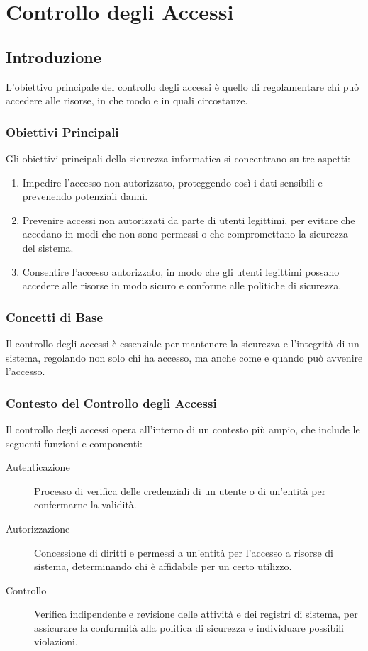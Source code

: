 \chapter{Controllo degli Accessi}

\section{Introduzione}

L'obiettivo principale del controllo degli accessi è quello di regolamentare chi può accedere alle risorse, in che modo e in quali circostanze.

\subsection{Obiettivi Principali}

Gli obiettivi principali della sicurezza informatica si concentrano su tre aspetti:

\begin{enumerate}
    \item Impedire l'accesso non autorizzato, proteggendo così i dati sensibili e prevenendo potenziali danni.
    \item Prevenire accessi non autorizzati da parte di utenti legittimi, per evitare che accedano in modi che non sono permessi o che compromettano la sicurezza del sistema.
    \item Consentire l'accesso autorizzato, in modo che gli utenti legittimi possano accedere alle risorse in modo sicuro e conforme alle politiche di sicurezza.
\end{enumerate}

\subsection{Concetti di Base}

Il controllo degli accessi è essenziale per mantenere la sicurezza e l'integrità di un sistema, regolando non solo chi ha accesso, ma anche come e quando può avvenire l'accesso.

\subsection{Contesto del Controllo degli Accessi}

Il controllo degli accessi opera all'interno di un contesto più ampio, che include le seguenti funzioni e componenti:

\begin{description}
    \item[Autenticazione] Processo di verifica delle credenziali di un utente o di un'entità per confermarne la validità.
    \item[Autorizzazione] Concessione di diritti e permessi a un'entità per l'accesso a risorse di sistema, determinando chi è affidabile per un certo utilizzo.
    \item[Controllo] Verifica indipendente e revisione delle attività e dei registri di sistema, per assicurare la conformità alla politica di sicurezza e individuare possibili violazioni.
\end{description}

